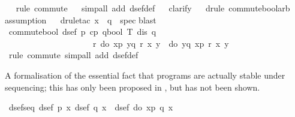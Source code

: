 \begin{isabellebody}
\ \ \isamarkupfalse%
rule\ commute{\isacharunderscore}{}{\isacharunderscore}{}{\isacharparenright}\isanewline
\ \ \isamarkupfalse%
simp{\isacharunderscore}all\ add{\isacharcolon}\ dsef{\isacharunderscore}def{\isacharparenright}\isanewline
\ \ \isamarkupfalse%
clarify{\isacharparenright}\isanewline
\ \ \isamarkupfalse%
drule\ commute{\isacharunderscore}bool{\isacharunderscore}arb{\isacharparenright}\isanewline
\ \ \isamarkupfalse%
assumption{\isacharparenright}{\isacharplus}\isanewline
\ \ \isamarkupfalse%
drule{\isacharunderscore}tac\ x\ {\isacharequal}\ q\ \ spec{\isacharparenright}\isanewline
\isamarkupfalse%
blast{\isacharparenright}\isanewline
\ \ \isanewline
\isamarkupfalse%
\ commute{\isacharunderscore}bool{\isacharcolon}\ {\isachardoublequote}{\isasymlbrakk}dsef\ p{\isacharsemicolon}\ cp\ {\isacharparenleft}q{\isacharcolon}{\isacharcolon}bool\ T{\isacharparenright}{\isacharsemicolon}\ dis\ q{\isasymrbrakk}\ {\isasymLongrightarrow}\ \isanewline
\ \ \ \ \ \ \ \ \ \ \ \ \ \ \ \ \ \ \ \ \ {\isasymforall}r{\isachardot}\ do\ {\isacharbraceleft}x{\isasymleftarrow}p{\isacharsemicolon}\ y{\isasymleftarrow}q{\isacharsemicolon}\ r\ x\ y{\isacharbraceright}\ {\isacharequal}\ do\ {\isacharbraceleft}y{\isasymleftarrow}q{\isacharsemicolon}\ x{\isasymleftarrow}p{\isacharsemicolon}\ r\ x\ y{\isacharbraceright}{\isachardoublequote}\isanewline
\isamarkupfalse%
\ {\isacharparenleft}rule\ commute{\isacharunderscore}{}{\isacharunderscore}{}{\isacharcomma}\ simp{\isacharunderscore}all\ add{\isacharcolon}\ dsef{\isacharunderscore}def{\isacharparenright}\isamarkupfalse%
%
\begin{isamarkuptext}%
A formalisation of the essential fact that  programs
  are actually stable under sequencing; this has only been proposed
  in \cite{SchroederMossakowski:PDL}, but has not been shown.
  \label{isa:dsef-seq}%
\end{isamarkuptext}%
\isamarkuptrue%
\ dsef{\isacharunderscore}seq{\isacharcolon}\ {\isachardoublequote}{\isasymlbrakk}dsef\ p{\isacharsemicolon}\ {\isasymforall}x{\isachardot}\ dsef\ {\isacharparenleft}q\ x{\isacharparenright}{\isasymrbrakk}\ {\isasymLongrightarrow}\ dsef\ {\isacharparenleft}do\ {\isacharbraceleft}x{\isasymleftarrow}p{\isacharsemicolon}\ q\ x{\isacharbraceright}{\isacharparenright}{\isachardoublequote}\isanewline

\end{isabellebody}
